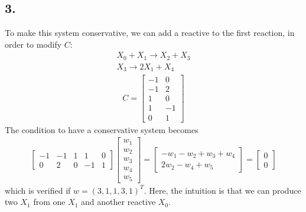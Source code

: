 \subsection*{3.}
To make this system conservative, we can add a reactive to the first reaction, in order to modify $C$:
\begin{eqnarray*}
X_0 + X_1\rightarrow X_2+X_3 \\
X_3\rightarrow 2X_1+X_4
\end{eqnarray*}
\begin{eqnarray*}
C = \begin{bmatrix}
-1 & 0\\
-1 & 2 \\
1 & 0 \\
1 & -1 \\
0 & 1
\end{bmatrix}
\end{eqnarray*}
The condition to have a conservative system becomes 
\begin{eqnarray*}
\begin{bmatrix}
-1 & -1 & 1 & 1 &0\\
0 & 2 & 0 & -1 & 1
\end{bmatrix}
\begin{bmatrix}
w_1 \\
w_2\\
w_3\\
w_4\\
w_5
\end{bmatrix} = \begin{bmatrix}
-w_1-w_2+w_3+w_4 \\
2w_2-w_4+w_5
\end{bmatrix} = \begin{bmatrix}
0 \\
0
\end{bmatrix}
\end{eqnarray*}
which is verified if $w = (3,1,1,3,1)^T$. Here, the intuition is that we can produce two $X_1$ from one $X_1$ and another reactive $X_0$.

